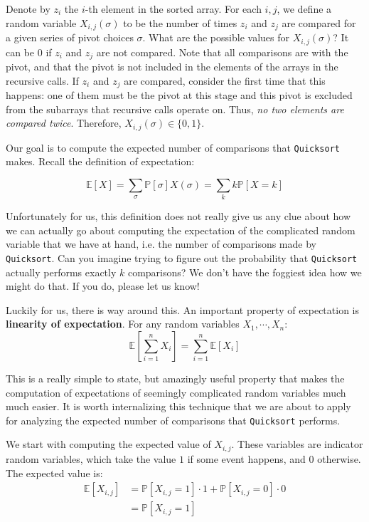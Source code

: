 \documentclass [12pt]{article}
\begin{document}
Denote by $z_i$ the $i$-th element in the sorted array. For each $i, j$, we define a random variable $X_{i ,j} (\sigma)$ to be the number of times $z_i$ and $z_j$ are compared for a given series of pivot choices $\sigma$. What are the possible values for $X_{i ,j} (\sigma)$? It can be $0$ if $z_i$ and $z_j$ are not compared. Note that all comparisons are with the pivot, and that the pivot is not included in the elements of the arrays in the recursive calls. If $z_i$ and $z_j$ are compared, consider the first time that this happens: one of them must be the pivot at this stage and this pivot is excluded from the subarrays that recursive calls operate on. Thus, \textit{no two elements are compared twice}. Therefore, $X_{i ,j} (\sigma) \in \{0, 1\}$. 

Our goal is to compute the expected number of comparisons that \texttt{Quicksort} makes. Recall the definition of expectation:

$$
\mathbb{E}[X] = \sum_{\sigma} \mathbb{P}[\sigma]X(\sigma) = \sum_{k} k\mathbb{P}[X = k]
$$

Unfortunately for us, this definition does not really give us any clue about how we can actually go about computing the expectation of the complicated random variable that we have at hand, i.e. the number of comparisons made by \texttt{Quicksort}. Can you imagine trying to figure out the probability that \texttt{Quicksort} actually performs exactly $k$ comparisons? We don’t have the foggiest idea how we might do that. If you do, please let us know!

Luckily for us, there is way around this. An important property of expectation is \textbf{linearity of expectation}. For any random variables $X_1, \cdots, X_n$:
$$
\mathbb{E}\left[\sum_{i=1}^n X_i \right] = \sum_{i=1}^n \mathbb{E}[X_i]
$$

This is a really simple to state, but amazingly useful property that makes the computation of expectations of seemingly complicated random variables much much easier. It is worth internalizing this technique that we are about to apply for analyzing the expected number of comparisons that \texttt{Quicksort} performs.

We start with computing the expected value of $X_{i ,j}$. These variables are indicator random variables, which take the value $1$ if some event happens, and $0$ otherwise. The expected value is:
\begin{align*}
\mathbb{E}[X_{i,j}] &= \mathbb{P}[X_{i,j} = 1] \cdot 1 + \mathbb{P}[X_{i,j} = 0] \cdot 0 \tag{definition of expectation} \\
&= \mathbb{P}[X_{i,j} = 1]
\end{align*}
\end{document}
